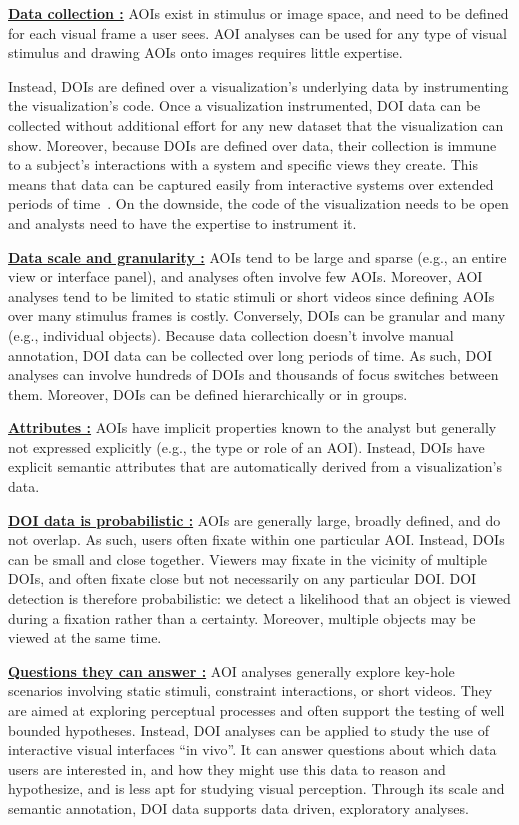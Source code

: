 \textbf{\underline{Data collection :}} AOIs exist in stimulus or image space, and need to be defined for each visual frame a user sees. AOI analyses can be used for any type of visual stimulus and drawing AOIs onto images requires little expertise. 

Instead, DOIs are defined over a visualization's underlying data by instrumenting the visualization's code. Once a visualization instrumented, DOI data can be collected without additional effort for any new dataset that the visualization can show. Moreover, because DOIs are defined over data, their collection is immune to a subject's interactions with a system and specific views they create. This means that data can be captured easily from interactive systems over extended periods of time~\cite{alam15analyzing}. On the downside, the code of the visualization needs to be open and analysts need to have the expertise to instrument it.

\textbf{\underline{Data scale and granularity :}} AOIs tend to be large and sparse (e.g., an entire view or interface panel), and analyses often involve few AOIs. Moreover, AOI analyses tend to be limited to static stimuli or short videos since defining AOIs over many stimulus frames is costly. Conversely, DOIs can be granular and many (e.g., individual objects). Because data collection doesn't involve manual annotation, DOI data can be collected over long periods of time. As such, DOI analyses can involve hundreds of DOIs and thousands of focus switches between them. Moreover, DOIs can be defined hierarchically or in groups. 

\textbf{\uline{Attributes :}} AOIs have implicit properties known to the analyst but generally not expressed explicitly (e.g., the type or role of an AOI). Instead, DOIs have explicit semantic attributes that are automatically derived from a visualization's data. 

\textbf{\underline{DOI data is probabilistic :}} AOIs are generally large, broadly defined, and do not overlap. As such, users often fixate within one particular AOI. Instead, DOIs can be small and close together. Viewers may fixate in the vicinity of multiple DOIs, and often fixate close but not necessarily on any particular DOI. DOI detection is therefore probabilistic: we detect a likelihood that an object is viewed during a fixation rather than a certainty. Moreover, multiple objects may be viewed at the same time. 
    
\textbf{\underline{Questions they can answer :}} AOI analyses generally explore key-hole scenarios involving static stimuli, constraint interactions, or short videos. They are aimed at exploring perceptual processes and often support the testing of well bounded hypotheses. Instead, DOI analyses can be applied to study the use of interactive visual interfaces ``in vivo''. It can answer questions about which data users are interested in, and how they might use this data to reason and hypothesize, and is less apt for studying visual perception. Through its scale and semantic annotation, DOI data supports data driven, exploratory analyses. 










